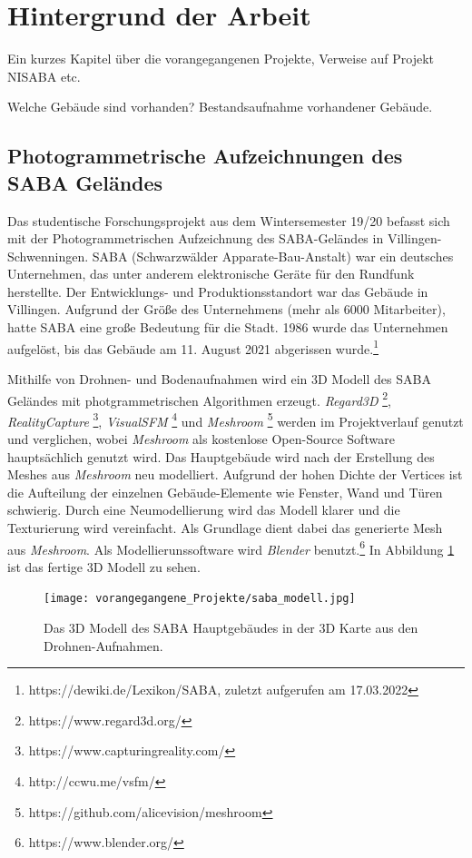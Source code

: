 \section{Hintergrund der Arbeit}
Ein kurzes Kapitel über die vorangegangenen Projekte, Verweise auf Projekt NISABA etc.

Welche Gebäude sind vorhanden? Bestandsaufnahme vorhandener Gebäude.

\subsection{Photogrammetrische Aufzeichnungen des SABA Geländes}
Das studentische Forschungsprojekt aus dem Wintersemester 19/20 \cite{reich2020} befasst sich mit  der Photogrammetrischen Aufzeichnung des SABA-Geländes in Villingen-Schwenningen. SABA (Schwarzwälder Apparate-Bau-Anstalt) war ein deutsches Unternehmen, das unter anderem elektronische Geräte für den Rundfunk herstellte. Der Entwicklungs- und Produktionsstandort war das Gebäude in Villingen. Aufgrund der Größe des Unternehmens (mehr als 6000 Mitarbeiter), hatte SABA eine große Bedeutung für die Stadt. 1986 wurde das Unternehmen aufgelöst, bis das Gebäude am 11. August 2021 abgerissen wurde.\footnote{https://dewiki.de/Lexikon/SABA, zuletzt aufgerufen am 17.03.2022} 

Mithilfe von Drohnen- und Bodenaufnahmen wird ein 3D Modell des SABA Geländes mit photgrammetrischen Algorithmen erzeugt. \textit{Regard3D} \footnote{https://www.regard3d.org/}, \textit{RealityCapture} \footnote{https://www.capturingreality.com/}, \textit{VisualSFM} \footnote{http://ccwu.me/vsfm/} und \textit{Meshroom} \footnote{https://github.com/alicevision/meshroom} werden im Projektverlauf genutzt und verglichen, wobei \textit{Meshroom} als kostenlose Open-Source Software hauptsächlich genutzt wird. Das Hauptgebäude wird nach der Erstellung des Meshes aus \textit{Meshroom} neu modelliert. Aufgrund der hohen Dichte der Vertices ist die Aufteilung der einzelnen Gebäude-Elemente wie Fenster, Wand und Türen schwierig. Durch eine Neumodellierung wird das Modell klarer und die Texturierung wird vereinfacht. Als Grundlage dient dabei das generierte Mesh aus \textit{Meshroom}. Als Modellierunssoftware wird \textit{Blender} benutzt.\footnote{https://www.blender.org/} In Abbildung \ref{fig:SABA3DModell} ist das fertige 3D Modell zu sehen.

\begin{figure}[ht]
    \centering
    \texttt{[image: vorangegangene\_Projekte/saba\_modell.jpg]}
    \caption{Das 3D Modell des SABA Hauptgebäudes in der 3D Karte aus den Drohnen-Aufnahmen.}
    \label{fig:SABA3DModell}
\end{figure}


